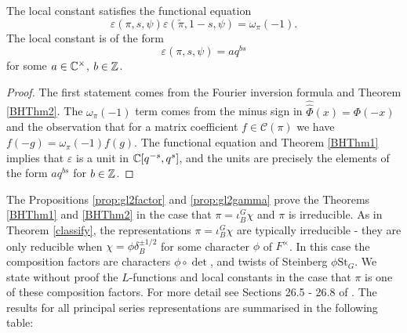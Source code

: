 \begin{cor}
    The local constant satisfies the functional equation
    $$\varepsilon(\pi,s,\psi)\varepsilon(\check{\pi},1-s,\psi) = \omega_\pi(-1).$$
    The local constant is of the form $$\varepsilon(\pi,s,\psi) = aq^{bs}$$ for some $a \in \mathbb{C}^\times$, $b \in \mathbb{Z}$. 
\end{cor}
\begin{proof}
    The first statement comes from the Fourier inversion formula and Theorem \ref{BHThm2}. The $\omega_\pi(-1)$ term comes from the minus sign in $\hat{\hat{\Phi}}(x)=\Phi(-x)$ and the observation that for a matrix coefficient $f \in \mathcal C(\pi)$ we have $f(-g)=\omega_\pi(-1)f(g)$. The functional equation and Theorem \ref{BHThm1} implies that $\varepsilon$ is a unit in $\mathbb{C}[q^{-s},q^s]$, and the units are precisely the elements of the form $aq^{bs}$ for $b \in \mathbb{Z}$.
\end{proof}

The Propositions \ref{prop:gl2factor} and \ref{prop:gl2gamma} prove the Theorems \ref{BHThm1} and \ref{BHThm2} in the case that $\pi = \iota_B^G \chi$ and $\pi$ is irreducible. As in Theorem \ref{classify}, the representations $\pi = \iota_B^G \chi$ are typically irreducible - they are only reducible when $\chi = \phi \delta_B^{\pm 1/2}$ for some character $\phi$ of $F^\times$. In this case the composition factors are characters $\phi \circ \det$, and twists of Steinberg $\phi \mathrm{St}_G$. We state without proof the $L$-functions and local constants in the case that $\pi$ is one of these composition factors. For more detail see Sections 26.5 - 26.8 of \cite{BH1}. The results for all principal series representations are summarised in the following table:

